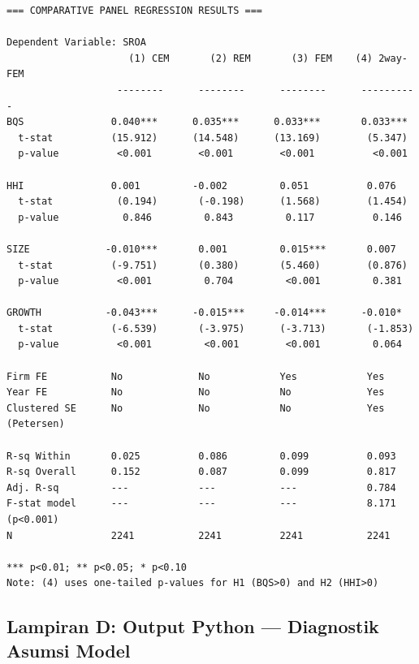 \documentclass[12pt,a4paper]{article}
\begin{document}
\begin{small}
\begin{verbatim}
=== COMPARATIVE PANEL REGRESSION RESULTS ===

Dependent Variable: SROA
                     (1) CEM       (2) REM       (3) FEM    (4) 2way-FEM
                   --------      --------      --------      ----------
BQS               0.040***      0.035***      0.033***       0.033***
  t-stat          (15.912)      (14.548)      (13.169)        (5.347)
  p-value          <0.001        <0.001        <0.001          <0.001

HHI               0.001         -0.002         0.051          0.076
  t-stat           (0.194)       (-0.198)      (1.568)        (1.454)
  p-value           0.846         0.843         0.117          0.146

SIZE             -0.010***       0.001         0.015***       0.007
  t-stat          (-9.751)       (0.380)       (5.460)        (0.876)
  p-value          <0.001         0.704         <0.001         0.381

GROWTH           -0.043***      -0.015***     -0.014***      -0.010*
  t-stat          (-6.539)       (-3.975)      (-3.713)       (-1.853)
  p-value          <0.001         <0.001        <0.001         0.064

Firm FE           No             No            Yes            Yes
Year FE           No             No            No             Yes
Clustered SE      No             No            No             Yes (Petersen)

R-sq Within       0.025          0.086         0.099          0.093
R-sq Overall      0.152          0.087         0.099          0.817
Adj. R-sq         ---            ---           ---            0.784
F-stat model      ---            ---           ---            8.171 (p<0.001)
N                 2241           2241          2241           2241

*** p<0.01; ** p<0.05; * p<0.10
Note: (4) uses one-tailed p-values for H1 (BQS>0) and H2 (HHI>0)
\end{verbatim}
\end{small}

\subsection{Lampiran D: Output Python --- Diagnostik Asumsi
Model}\label{lampiran-d-output-python-diagnostik-asumsi-model}
\end{document}
